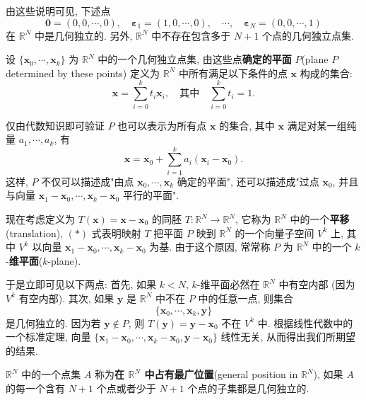 由这些说明可见, 下述点
\[
\boldsymbol{0}=(0,0,\cdots,0),\quad
\boldsymbol{\varepsilon}_{1}=(1,0,\cdots,0),\quad\cdots,\quad
\boldsymbol{\varepsilon}_{N}=(0,0,\cdots,1)
\]
在 $\mathbb{R}^{N}$ 中是几何独立的. 另外, $\mathbb{R}^{N}$ 中不存在包含多于 $N+1$ 个点的几何独立点集.

\begin{definition}[由点确定的平面]
\label{definition:ch08-sec50-plane}
设 $\{\boldsymbol{x}_0,\cdots,\boldsymbol{x}_k\}$ 为 $\mathbb{R}^{N}$ 中的一个几何独立点集, 由这些点\textbf{确定的平面} $P$(plane $P$ determined by these points) 定义为 $\mathbb{R}^{N}$ 中所有满足以下条件的点 $\boldsymbol{x}$ 构成的集合:
\[
\boldsymbol{x}=\sum_{i=0}^{k}t_{i}\boldsymbol{x}_{i},\quad\text{其中}\quad\sum_{i=0}^{k}t_{i}=1.
\]
\end{definition}

仅由代数知识即可验证 $P$ 也可以表示为所有点 $\boldsymbol{x}$ 的集合, 其中 $\boldsymbol{x}$ 满足对某一组纯量 $a_1,\cdots,a_k$, 有
\[
\boldsymbol{x}=\boldsymbol{x}_{0}+\sum_{i=1}^{k}a_{i}(\boldsymbol{x}_{i}-\boldsymbol{x}_{0}). \tag{$*$}
\]
这样, $P$ 不仅可以描述成"由点 $\boldsymbol{x}_0,\cdots,\boldsymbol{x}_k$ 确定的平面", 还可以描述成"过点 $\boldsymbol{x}_0$, 并且与向量 $\boldsymbol{x}_1-\boldsymbol{x}_0,\cdots,\boldsymbol{x}_k-\boldsymbol{x}_0$ 平行的平面".

现在考虑定义为 $T(\boldsymbol{x})=\boldsymbol{x}-\boldsymbol{x}_0$ 的同胚 $T\colon\mathbb{R}^{N}\to\mathbb{R}^{N}$, 它称为 $\mathbb{R}^{N}$ 中的一个\textbf{平移}(translation), $(*)$ 式表明映射 $T$ 把平面 $P$ 映到 $\mathbb{R}^{N}$ 的一个向量子空间 $V^k$ 上, 其中 $V^k$ 以向量 $\boldsymbol{x}_1-\boldsymbol{x}_0,\cdots,\boldsymbol{x}_k-\boldsymbol{x}_0$ 为基. 由于这个原因, 常常称 $P$ 为 $\mathbb{R}^{N}$ 中的一个 $k$-\textbf{维平面}($k$-plane).

于是立即可见以下两点: 首先, 如果 $k<N$, $k$-维平面必然在 $\mathbb{R}^{N}$ 中有空内部 (因为 $V^k$ 有空内部). 其次, 如果 $\boldsymbol{y}$ 是 $\mathbb{R}^{N}$ 中不在 $P$ 中的任意一点, 则集合
\[
\{\boldsymbol{x}_{0},\cdots,\boldsymbol{x}_{k},\boldsymbol{y}\}
\]
是几何独立的. 因为若 $\boldsymbol{y}\notin P$, 则 $T(\boldsymbol{y})=\boldsymbol{y}-\boldsymbol{x}_0$ 不在 $V^k$ 中. 根据线性代数中的一个标准定理, 向量 $\{\boldsymbol{x}_1-\boldsymbol{x}_0,\cdots,\boldsymbol{x}_k-\boldsymbol{x}_0,\boldsymbol{y}-\boldsymbol{x}_0\}$ 线性无关, 从而得出我们所期望的结果.

\begin{definition}[占有最广位置]
\label{definition:ch08-sec50-general-pos}
$\mathbb{R}^{N}$ 中的一个点集 $A$ 称为\textbf{在 $\mathbb{R}^{N}$ 中占有最广位置}(general position in $\mathbb{R}^{N}$), 如果 $A$ 的每一个含有 $N+1$ 个点或者少于 $N+1$ 个点的子集都是几何独立的.
\end{definition}

